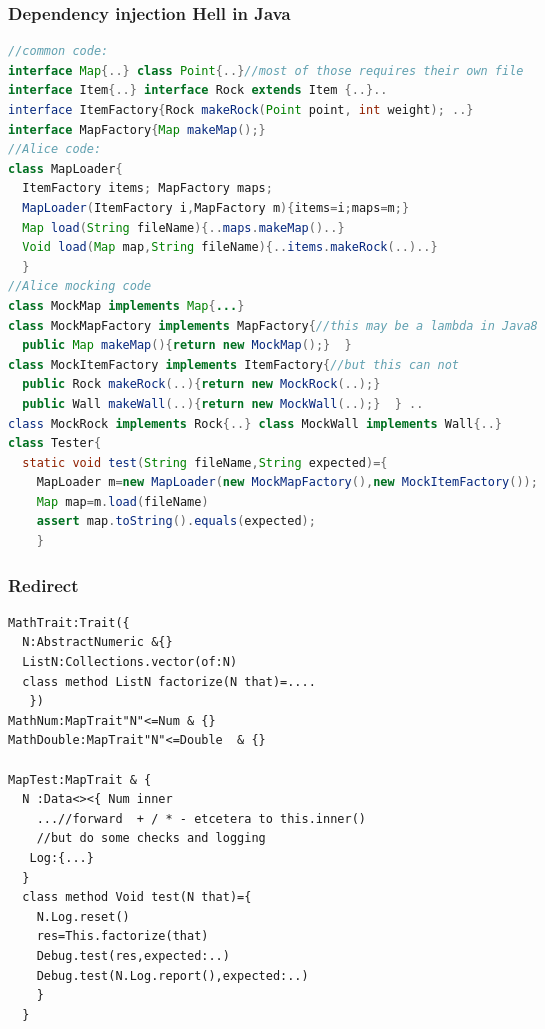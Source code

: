 \begin{frame}[fragile]
\frametitle{Dependency injection Hell in Java}
\begin{NiceCode}{59ex}{0.7}
\begin{lstlisting}[language=Java, morekeywords={assert}]
//common code:
interface Map{..} class Point{..}//most of those requires their own file
interface Item{..} interface Rock extends Item {..}..
interface ItemFactory{Rock makeRock(Point point, int weight); ..}
interface MapFactory{Map makeMap();}
//Alice code:
class MapLoader{
  ItemFactory items; MapFactory maps;
  MapLoader(ItemFactory i,MapFactory m){items=i;maps=m;}
  Map load(String fileName){..maps.makeMap()..}
  Void load(Map map,String fileName){..items.makeRock(..)..}
  }
//Alice mocking code
class MockMap implements Map{...}
class MockMapFactory implements MapFactory{//this may be a lambda in Java8
  public Map makeMap(){return new MockMap();}  }
class MockItemFactory implements ItemFactory{//but this can not
  public Rock makeRock(..){return new MockRock(..);}
  public Wall makeWall(..){return new MockWall(..);}  } ..
class MockRock implements Rock{..} class MockWall implements Wall{..}
class Tester{
  static void test(String fileName,String expected)={
    MapLoader m=new MapLoader(new MockMapFactory(),new MockItemFactory());
    Map map=m.load(fileName)
    assert map.toString().equals(expected);
    }
\end{lstlisting}
\end{NiceCode}
\end{frame}


\begin{frame}[fragile]
\frametitle{Redirect}
\begin{NiceCode}{59ex}{0.7}
\begin{lstlisting}
MathTrait:Trait({
  N:AbstractNumeric &{}
  ListN:Collections.vector(of:N)
  class method ListN factorize(N that)=....
   })
MathNum:MapTrait"N"<=Num & {}
MathDouble:MapTrait"N"<=Double  & {}

MapTest:MapTrait & {
  N :Data<><{ Num inner
    ...//forward  + / * - etcetera to this.inner()
    //but do some checks and logging
   Log:{...} 
  }
  class method Void test(N that)={
    N.Log.reset()
    res=This.factorize(that)
    Debug.test(res,expected:..)
    Debug.test(N.Log.report(),expected:..)
    }
  }
\end{lstlisting}
\end{NiceCode}
\end{frame}


%

